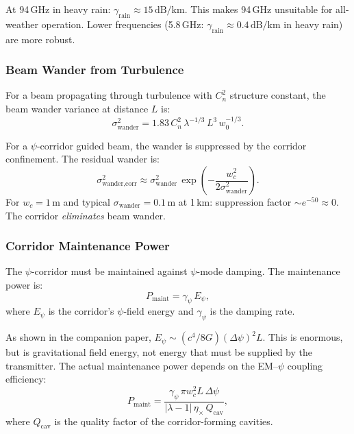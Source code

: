 \documentclass[journal,twocolumn]{IEEEtran}
\begin{document}
At 94\,GHz in heavy rain: $\gamma_\text{rain} \approx 15\,\text{dB/km}$.
This makes 94\,GHz unsuitable for all-weather operation. Lower
frequencies (5.8\,GHz: $\gamma_\text{rain} \approx 0.4\,\text{dB/km}$
in heavy rain) are more robust.

\subsubsection{Beam Wander from Turbulence}

For a beam propagating through turbulence with $C_n^2$ structure constant,
the beam wander variance at distance $L$ is:
\begin{equation}
\sigma_\text{wander}^2 = 1.83\,C_n^2\,\lambda^{-1/3}\,L^3\,w_0^{-1/3}.
\end{equation}

For a $\psi$-corridor guided beam, the wander is suppressed by the
corridor confinement. The residual wander is:
\begin{equation}
\sigma_\text{wander,corr}^2
\approx \sigma_\text{wander}^2\,\exp\!\left(-\frac{w_c^2}{2\sigma_\text{wander}^2}\right).
\end{equation}
For $w_c = 1\,\text{m}$ and typical $\sigma_\text{wander} = 0.1\,\text{m}$
at 1\,km: suppression factor $\sim e^{-50} \approx 0$. The corridor
\emph{eliminates} beam wander.

\subsubsection{Corridor Maintenance Power}

The $\psi$-corridor must be maintained against $\psi$-mode damping.
The maintenance power is:
\begin{equation}
P_\text{maint} = \gamma_\psi\,E_\psi,
\end{equation}
where $E_\psi$ is the corridor's $\psi$-field energy and $\gamma_\psi$
is the damping rate.

As shown in the companion paper, $E_\psi \sim (c^4/8G)(\Delta\psi)^2 L$.
This is enormous, but is gravitational field energy, not energy that
must be supplied by the transmitter. The actual maintenance power depends
on the EM--$\psi$ coupling efficiency:
\begin{equation}
P_\text{maint} = \frac{\gamma_\psi\,\pi w_c^2 L\,\Delta\psi}
{|\lambda-1|\,\eta_\times\,Q_\text{cav}},
\end{equation}
where $Q_\text{cav}$ is the quality factor of the corridor-forming cavities.
\end{document}
